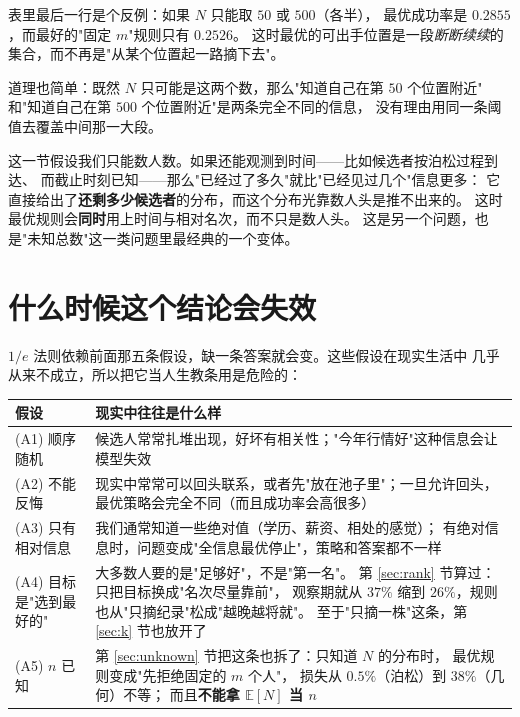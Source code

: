 \documentclass[UTF8,11pt,fontset=macnew]{ctexart}
\begin{document}
\begin{warnbox}["固定 $m$ 最优"不是定理]
表里最后一行是个反例：如果 $N$ 只能取 $50$ 或 $500$（各半），
最优成功率是 $0.2855$，而最好的"固定 $m$"规则只有 $0.2526$。
这时最优的可出手位置是一段\emph{断断续续}的集合，而不再是"从某个位置起一路摘下去"。

道理也简单：既然 $N$ 只可能是这两个数，那么"知道自己在第 $50$ 个位置附近"
和"知道自己在第 $500$ 个位置附近"是两条完全不同的信息，
没有理由用同一条阈值去覆盖中间那一大段。
\end{warnbox}

\begin{keybox}
这一节假设我们只能数人数。如果还能观测到时间——比如候选者按泊松过程到达、
而截止时刻已知——那么"已经过了多久"就比"已经见过几个"信息更多：
它直接给出了\textbf{还剩多少候选者}的分布，而这个分布光靠数人头是推不出来的。
这时最优规则会\textbf{同时}用上时间与相对名次，而不只是数人头。
这是另一个问题，也是"未知总数"这一类问题里最经典的一个变体。
\end{keybox}

\section{什么时候这个结论会失效}
\label{sec:limits}

$1/e$ 法则依赖前面那五条假设，缺一条答案就会变。这些假设在现实生活中
几乎从来不成立，所以把它当人生教条用是危险的：

\begin{center}
\begin{tabular}{p{5.6cm} p{8.2cm}}
\toprule
假设 & 现实中往往是什么样 \\
\midrule
(A1) 顺序随机 & 候选人常常扎堆出现，好坏有相关性；"今年行情好"这种信息会让模型失效 \\
(A2) 不能反悔 & 现实中常常可以回头联系，或者先"放在池子里"；一旦允许回头，
                最优策略会完全不同（而且成功率会高很多） \\
(A3) 只有相对信息 & 我们通常知道一些绝对值（学历、薪资、相处的感觉）；
                有绝对信息时，问题变成"全信息最优停止"，策略和答案都不一样 \\
(A4) 目标是"选到最好的" & 大多数人要的是"足够好"，不是"第一名"。
                第 \ref{sec:rank} 节算过：只把目标换成"名次尽量靠前"，
                观察期就从 $37\%$ 缩到 $26\%$，规则也从"只摘纪录"松成"越晚越将就"。
                至于"只摘一株"这条，第 \ref{sec:k} 节也放开了 \\
(A5) $n$ 已知 & 第 \ref{sec:unknown} 节把这条也拆了：只知道 $N$ 的分布时，
                最优规则变成"先拒绝固定的 $m$ 个人"，
                损失从 $0.5\%$（泊松）到 $38\%$（几何）不等；
                而且\textbf{不能拿 $\mathbb{E}[N]$ 当 $n$} \\
\bottomrule
\end{tabular}
\end{center}
\end{document}
